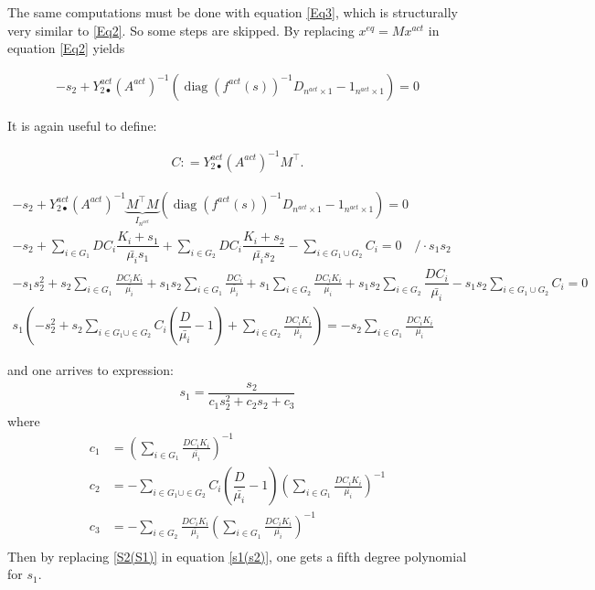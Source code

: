 \documentclass[3p,times]{article}
\DeclareMathOperator{\diag}{diag}
\begin{document}
The same computations must be done with equation \eqref{Eq3}, which is structurally very similar to \eqref{Eq2}. So some steps are skipped. By replacing $x^{eq} = Mx^{act}$ in equation \eqref{Eq2} yields

\begin{align}
\label{s2Equilibria} -s_2 + Y^{act}_{2\bullet}(A^{act})^{-1}(\diag(f^{act}(s))^{-1}D_{n^{act}\times 1} - 1_{n^{act}\times 1}) = 0
\end{align}

It is again useful to define:

\begin{align}
C: = Y^{act}_{2\bullet} (A^{act})^{-1}M^\top.
\end{align}

\begin{align}
-s_2 + Y^{act}_{2\bullet}(A^{act})^{-1}\underbrace{M^\top M}_{I_{n^{act}}}(\diag(f^{act}(s))^{-1} D_{n^{act}\times 1} - 1_{n^{act}\times 1}) = 0\\
- s_2 + \sum \limits_{i \in G_1 } DC_i \dfrac{K_i+s_1}{\bar{\mu_i}s_1}+ \sum \limits_{i \in G_2 } DC_i \dfrac{K_i+s_2}{\bar{\mu_i}s_2} - \sum \limits_{i \in G_1 \cup G_2}C_i= 0 \quad /\cdot s_1s_2
\\
\displaystyle- s_1s_2^2 + s_2\sum \limits_{i \in G_1 } \frac{DC_iK_i}{\bar{\mu_i}}+s_1s_2\sum \limits_{i \in G_1 } \frac{DC_i}{\bar{\mu_i}}+ s_1\sum \limits_{i \in G_2 } \frac{DC_iK_i}{\bar{\mu_i}} + s_1s_2\sum \limits_{i \in G_2 } \dfrac{DC_i}{\bar{\mu_i}} - s_1s_2\sum \limits_{i \in G_1 \cup G_2}C_i= 0 \\
\displaystyle s_1\left( - s^2_2 +s_2\sum \limits_{i \in G_1 \cup \in G_2 } C_i\left(\dfrac{D}{\bar{\mu_i}}-1\right)  + \sum \limits_{i \in G_2} \frac{DC_iK_i}{\bar{\mu_i}}\right) = - s_2\sum \limits_{i \in G_1 } \frac{DC_iK_i}{\bar{\mu_i}}
\end{align}

and one arrives to expression:
\begin{align}
\label{s1(s2)} s_1 = \dfrac{s_2}{c_1s_2^2 + c_2s_2 + c_3}
\end{align}
where
\begin{align}
\displaystyle c_1 & =  \left(\sum \limits_{i \in G_1 } \frac{DC_iK_i}{\bar{\mu_i}} \right)^{-1} \\
\displaystyle c_2 & = -\sum \limits_{i \in G_1 \cup \in G_2 } C_i\left(\dfrac{D}{\bar{\mu_i}}-1\right)  \left(\sum \limits_{i \in G_1 } \frac{DC_iK_i}{\bar{\mu_i}} \right)^{-1} \\
\displaystyle c_3 & = -\sum \limits_{i \in G_2} \frac{DC_iK_i}{\bar{\mu_i}} \left(\sum \limits_{i \in G_1 } \frac{DC_iK_i}{\bar{\mu_i}} \right)^{-1} \\
\end{align} 
Then by replacing  \eqref{S2(S1)} in equation \eqref{s1(s2)}, one gets a fifth degree polynomial for $s_1$. 
\end{document}
